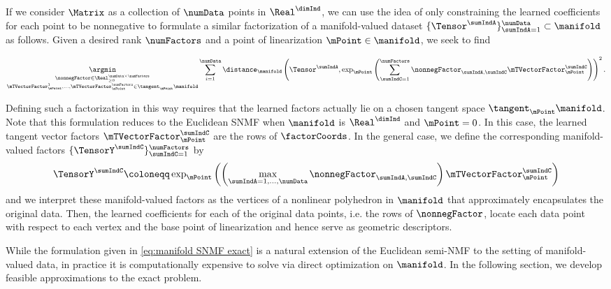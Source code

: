 If we consider $\Matrix$ as a collection of $\numData$ points in $\Real^\dimInd$, we can use the idea of only constraining the learned coefficients for each point to be nonnegative to formulate a similar factorization of a manifold-valued dataset $\{\Tensor^\sumIndA\}_{\sumIndA = 1}^\numData \subset \manifold$ as follows. Given a desired rank $\numFactors$ and a point of linearization $\mPoint \in \manifold$, we seek to find

\begin{equation}
    \label{eq:manifold SNMF exact}
    \underset{\substack{\nonnegFactor \in \Real_{\geq 0}^{\numData \times \numFactors} \\
    \mTVectorFactor_\mPoint^1, \dots, \mTVectorFactor_\mPoint^\numFactors \in \tangent_\mPoint\manifold}}{\argmin} \sum_{i=1}^\numData \distance_\manifold \left(\Tensor^\sumIndA, \exp_\mPoint \left(\sum_{\sumIndC=1}^\numFactors \nonnegFactor_{\sumIndA,\sumIndC} \mTVectorFactor_\mPoint^\sumIndC\right)\right)^2.
\end{equation}

Defining such a factorization in this way requires that the learned factors actually lie on a chosen tangent space $\tangent_\mPoint \manifold$. Note that this formulation reduces to the Euclidean SNMF when $\manifold$ is $\Real^\dimInd$ and $\mPoint = 0$. In this case, the learned tangent vector factors $\mTVectorFactor_\mPoint^\sumIndC$ are the rows of $\factorCoords$. 
In the general case, we define the corresponding manifold-valued factors $\{\TensorY^\sumIndC\}_{\sumIndC = 1}^\numFactors$ by
\begin{equation}
\label{eq:manifold valued factors}
    \TensorY^\sumIndC \coloneqq \exp_\mPoint \left ( \left(\max_{\sumIndA = 1, \dots, \numData} \nonnegFactor_{\sumIndA, \sumIndC} \right) \mTVectorFactor_\mPoint^\sumIndC \right )
\end{equation}
and we interpret these manifold-valued factors as the vertices of a nonlinear polyhedron in $\manifold$ that approximately encapsulates the original data. Then, the learned coefficients for each of the original data points, i.e. the rows of $\nonnegFactor$, locate each data point with respect to each vertex and the base point of linearization and hence serve as geometric descriptors. 

While the formulation given in \eqref{eq:manifold SNMF exact} is a natural extension of the Euclidean semi-NMF to the setting of manifold-valued data, in practice it is computationally expensive to solve via direct optimization on $\manifold$. In the following section, we develop feasible approximations to the exact problem.

